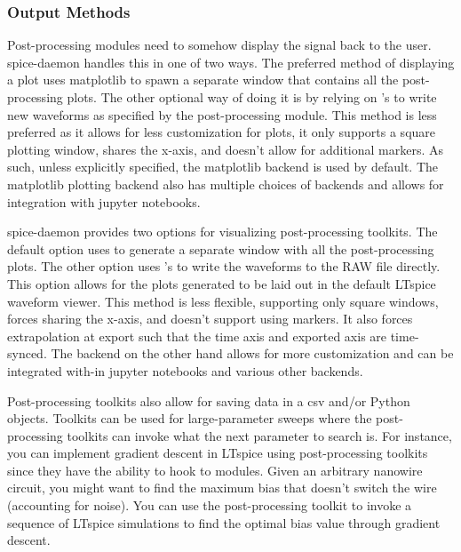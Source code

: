 
\subsubsection{Output Methods}

Post-processing modules need to somehow display the signal back to the user. spice-daemon handles this
in one of two ways. The preferred method of displaying a plot uses matplotlib to spawn a separate window
that contains all the post-processing plots. The other optional way of doing it is by relying on 
's  to write new waveforms as specified by the post-processing module.
This method is less preferred as it allows for less customization for plots, it only supports a square
plotting window, shares the x-axis, and doesn't allow for additional markers. As such, unless explicitly
specified, the matplotlib backend is used by default. The matplotlib plotting backend also has multiple 
choices of backends and allows for integration with jupyter notebooks. 

spice-daemon provides two options for visualizing post-processing toolkits. The default
option uses  to generate a separate window with all the post-processing
plots. The other option uses 's  to write the waveforms
to the RAW file directly. This option allows for the plots generated to be laid out in the
default LTspice waveform viewer. This method is less flexible, supporting only square 
windows, forces sharing the x-axis, and doesn't support using markers. It also forces
extrapolation at export such that the time axis and exported axis are time-synced.
The  backend on the other hand allows for more customization and 
can be integrated with-in jupyter notebooks and various other  backends.

Post-processing toolkits also allow for saving data in a csv and/or Python objects. 
Toolkits can be used for large-parameter sweeps where the post-processing toolkits
can invoke what the next parameter to search is. For instance, you can implement
gradient descent in LTspice using post-processing toolkits since they have the ability
to hook to modules. Given an arbitrary nanowire circuit, you might want to find the
maximum bias that doesn't switch the wire (accounting for noise). You can use 
the post-processing toolkit to invoke a sequence of LTspice simulations to find
the optimal bias value through gradient descent.

